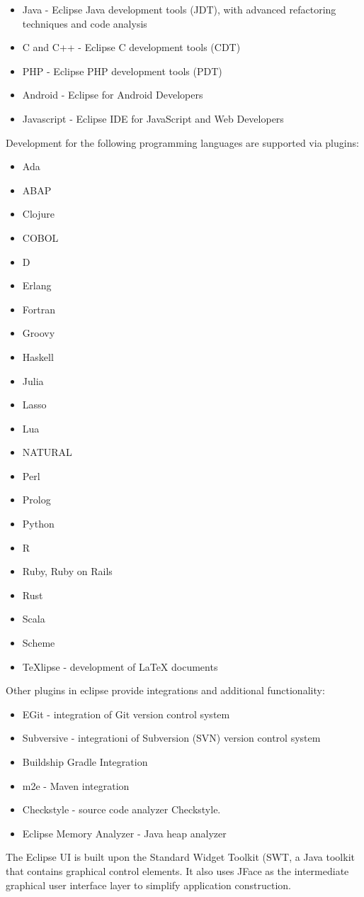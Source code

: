 \begin{itemize}
\item Java - Eclipse Java development tools (JDT), with advanced refactoring techniques and code analysis
\item C and C++ - Eclipse C development tools (CDT)
\item PHP - Eclipse PHP development tools (PDT)
\item Android - Eclipse for Android Developers
\item Javascript - Eclipse IDE for JavaScript and Web Developers
\end{itemize}
Development for the following programming languages are supported via plugins: \cite{eclipsemarket}
\begin{multicols}{3}
\begin{itemize}
\item Ada
\item ABAP
\item Clojure
\item COBOL
\item D
\item Erlang
\item Fortran
\item Groovy
\item Haskell
\item Julia
\item Lasso
\item Lua
\item NATURAL
\item Perl
\item Prolog
\item Python
\item R
\item Ruby, Ruby on Rails
\item Rust
\item Scala
\item Scheme
\item TeXlipse - development of LaTeX documents
\end{itemize}
\end{multicols}
Other plugins in eclipse provide integrations and additional functionality: \cite{eclipsemarket}
\begin{itemize}
\item EGit - integration of Git version control system
\item Subversive - integrationi of Subversion (SVN) version control system
\item Buildship Gradle Integration
\item m2e - Maven integration
\item Checkstyle - source code analyzer Checkstyle.
\item Eclipse Memory Analyzer - Java heap analyzer
\end{itemize}
The Eclipse UI is built upon the Standard Widget Toolkit (SWT, a Java toolkit that contains graphical control elements. It also uses JFace as the intermediate graphical user interface layer to simplify application construction.

